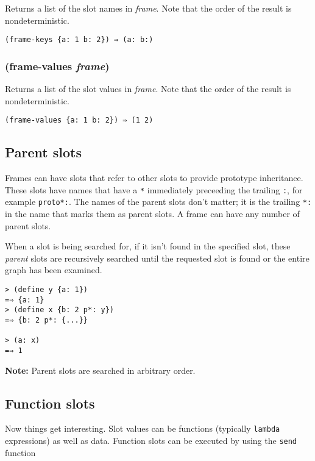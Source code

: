\documentclass{article}
\begin{document}
Returns a list of the slot names in \emph{frame}. Note that the order of the result is
nondeterministic.

\begin{verbatim}
(frame-keys {a: 1 b: 2}) ⇒ (a: b:)
\end{verbatim}

\subsubsection{(frame-values \emph{frame})}

Returns a list of the slot values in \emph{frame}. Note that the order of the result is
nondeterministic.

\begin{verbatim}
(frame-values {a: 1 b: 2}) ⇒ (1 2)
\end{verbatim}

\subsection{Parent slots}\label{sec:parent-slots}

Frames can have slots that refer to other slots to provide prototype inheritance. These slots
have names that have a \verb|*| immediately preceeding the trailing \verb|:|, for example
\verb|proto*:|. The names of the parent slots don't matter; it is the trailing \verb|*:|
in the name that marks them as parent slots. A frame can have any number of parent slots.

When a slot is being searched for, if it isn't found in the specified slot, these
\emph{parent} slots are recursively searched until the requested slot is found or the entire
graph has been examined.

\begin{verbatim}
> (define y {a: 1})
=⇒ {a: 1}
> (define x {b: 2 p*: y})
=⇒ {b: 2 p*: {...}}

> (a: x)
=⇒ 1
\end{verbatim}

\textbf{Note:} Parent slots are searched in arbitrary order.

\subsection{Function slots}\label{sec:function-slots}

Now things get interesting. Slot values can be functions (typically \verb|lambda|
expressions) as well as data. Function slots can be executed by using the \verb|send|
function
\end{document}
